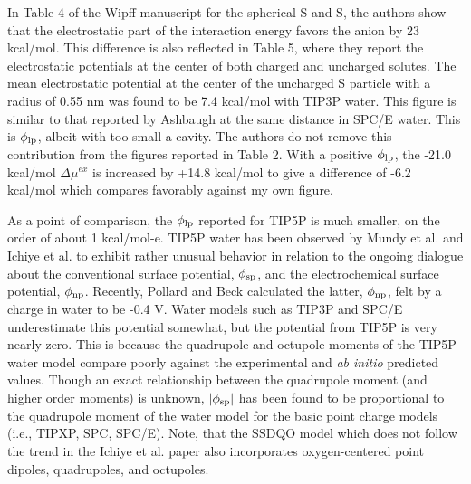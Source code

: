 \begin{tatb}
  In Table 4 of the Wipff manuscript for the spherical S\sur{+} and S\sur{-}, the authors show that the electrostatic part of the interaction energy favors the anion
  by 23 kcal/mol\cite{wipff2000tatb}. This difference is also reflected in Table 5, where they report the electrostatic potentials at the center of both charged and
  uncharged solutes\cite{wipff2000tatb}. The mean electrostatic potential at the center of the uncharged S particle with a radius of 0.55 nm was found to be 7.4
  kcal/mol with TIP3P water. This figure is similar to that reported by Ashbaugh at the same distance in SPC/E water\cite{ashbaugh2000size_sp}. This is $\phi_{\mathrm{lp}}$,
  albeit with too small a cavity. The authors do not remove this contribution from the figures reported in Table 2\cite{wipff2000tatb}. With a positive $\phi_{\mathrm{lp}}$,
  the -21.0 kcal/mol $\Delta\mu^{ex}$ is increased by +14.8 kcal/mol to give a difference of -6.2 kcal/mol which compares favorably against my own figure.

  As a point of comparison, the $\phi_{\mathrm{lp}}$ reported for TIP5P is much smaller, on the order of about 1 kcal/mol-e\cite{wipff2000tatb}. TIP5P water has been observed
  by Mundy et al.\cite{remsing2014lp} and Ichiye et al.\cite{ichiye2015sp} to exhibit rather unusual behavior in relation to the ongoing dialogue about the conventional
  surface potential, $\phi_{\mathrm{sp}}$, and the electrochemical surface potential, $\phi_{\mathrm{np}}$. Recently, Pollard and Beck calculated the latter, $\phi_{\mathrm{np}}$, felt
  by a charge in water to be -0.4 V\cite{pollard2014cpa1, pollard2014cpa2}. Water models such as TIP3P and SPC/E underestimate this potential somewhat, but the
  potential from TIP5P is very nearly zero. This is because the quadrupole and octupole moments of the TIP5P water model compare poorly against the experimental and
  \emph{ab initio} predicted  values\cite{niu2011large}. Though an exact relationship between the quadrupole moment (and higher order moments) is unknown, 
  $\left|\phi_{\mathrm{sp}}\right|$ has been found to be proportional to the quadrupole moment of the water model for the basic point charge models 
  (i.e., TIPXP, SPC, SPC/E)\cite{ichiye2015sp}. Note, that the SSDQO model which does not follow the trend in the Ichiye et al. paper also incorporates oxygen-centered
  point dipoles, quadrupoles, and octupoles.


\end{tatb}
